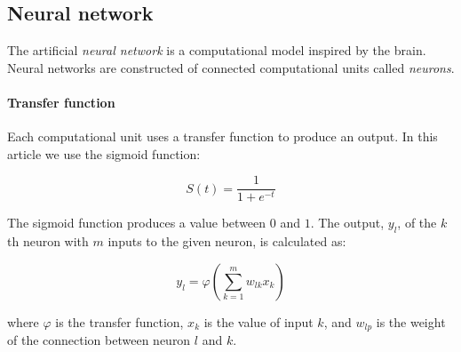 \subsection{Neural network}

The artificial \emph{neural network} is a computational model inspired by the brain. Neural networks are constructed of connected computational units called \emph{neurons}.

\paragraph{Transfer function}

Each computational unit uses a transfer function to produce an output. In this article we use the sigmoid function:

\[
    S(t) = \frac{1}{1+e^{-t}}
\]

The sigmoid function produces a value between $0$ and $1$. The output, $y_l$, of the $k$th neuron with $m$ inputs to the given neuron, is calculated as:

\[
    y_l = \varphi\left( \sum_{k=1}^m w_{lk} x_k \right)
\]

where $\varphi$ is the transfer function, $x_k$ is the value of input $k$, and $w_{l p}$ is the weight of the connection between neuron $l$ and $k$.
